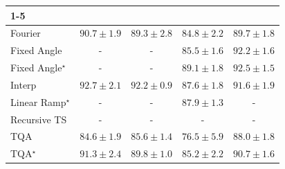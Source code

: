 \begin{tabular}{l|cccc|}
\cline{1-5}
\multicolumn{5}{c}{\rule{0pt}{8pt}PP} \\
\midrule
Fourier & {\cellcolor[HTML]{167A3F}} \color[HTML]{F1F1F1} $90.7\pm 1.9$ & {\cellcolor[HTML]{228343}} \color[HTML]{F1F1F1} $89.3\pm 2.8$ & {\cellcolor[HTML]{47AE60}} \color[HTML]{F1F1F1} $84.8\pm 2.2$ & {\cellcolor[HTML]{1F8142}} \color[HTML]{F1F1F1} $89.7\pm 1.8$ \\
Fixed Angle & {\cellcolor[HTML]{000000}} \color[HTML]{F1F1F1} {\cellcolor{white}} \color{black} - & {\cellcolor[HTML]{000000}} \color[HTML]{F1F1F1} {\cellcolor{white}} \color{black} - & {\cellcolor[HTML]{3FA95C}} \color[HTML]{F1F1F1} $85.5\pm 1.6$ & {\cellcolor[HTML]{096F3A}} \color[HTML]{F1F1F1} $92.2\pm 1.6$ \\
Fixed Angle$^\star$ & {\cellcolor[HTML]{000000}} \color[HTML]{F1F1F1} {\cellcolor{white}} \color{black} - & {\cellcolor[HTML]{000000}} \color[HTML]{F1F1F1} {\cellcolor{white}} \color{black} - & {\cellcolor[HTML]{248644}} \color[HTML]{F1F1F1} $89.1\pm 1.8$ & {\cellcolor[HTML]{066D39}} \color[HTML]{F1F1F1} $92.5\pm 1.5$ \\
Interp & {\cellcolor[HTML]{056C39}} \color[HTML]{F1F1F1} $92.7\pm 2.1$ & {\cellcolor[HTML]{096F3A}} \color[HTML]{F1F1F1} $92.2\pm 0.9$ & {\cellcolor[HTML]{2F944E}} \color[HTML]{F1F1F1} $87.6\pm 1.8$ & {\cellcolor[HTML]{0E743C}} \color[HTML]{F1F1F1} $91.6\pm 1.9$ \\
Linear Ramp$^\star$ & {\cellcolor[HTML]{000000}} \color[HTML]{F1F1F1} {\cellcolor{white}} \color{black} - & {\cellcolor[HTML]{000000}} \color[HTML]{F1F1F1} {\cellcolor{white}} \color{black} - & {\cellcolor[HTML]{2D914B}} \color[HTML]{F1F1F1} $87.9\pm 1.3$ & {\cellcolor[HTML]{000000}} \color[HTML]{F1F1F1} {\cellcolor{white}} \color{black} - \\
Recursive TS & {\cellcolor[HTML]{000000}} \color[HTML]{F1F1F1} {\cellcolor{white}} \color{black} - & {\cellcolor[HTML]{000000}} \color[HTML]{F1F1F1} {\cellcolor{white}} \color{black} - & {\cellcolor[HTML]{000000}} \color[HTML]{F1F1F1} {\cellcolor{white}} \color{black} - & {\cellcolor[HTML]{000000}} \color[HTML]{F1F1F1} {\cellcolor{white}} \color{black} - \\
TQA & {\cellcolor[HTML]{4AB062}} \color[HTML]{F1F1F1} $84.6\pm 1.9$ & {\cellcolor[HTML]{3FA85B}} \color[HTML]{F1F1F1} $85.6\pm 1.4$ & {\cellcolor[HTML]{B6E192}} \color[HTML]{000000} $76.5\pm 5.9$ & {\cellcolor[HTML]{2D914B}} \color[HTML]{F1F1F1} $88.0\pm 1.8$ \\
TQA$^\star$ & {\cellcolor[HTML]{11753D}} \color[HTML]{F1F1F1} $91.3\pm 2.4$ & {\cellcolor[HTML]{1E8041}} \color[HTML]{F1F1F1} $89.8\pm 1.0$ & {\cellcolor[HTML]{42AB5D}} \color[HTML]{F1F1F1} $85.2\pm 2.2$ & {\cellcolor[HTML]{167A3F}} \color[HTML]{F1F1F1} $90.7\pm 1.6$ \\

\end{tabular}
